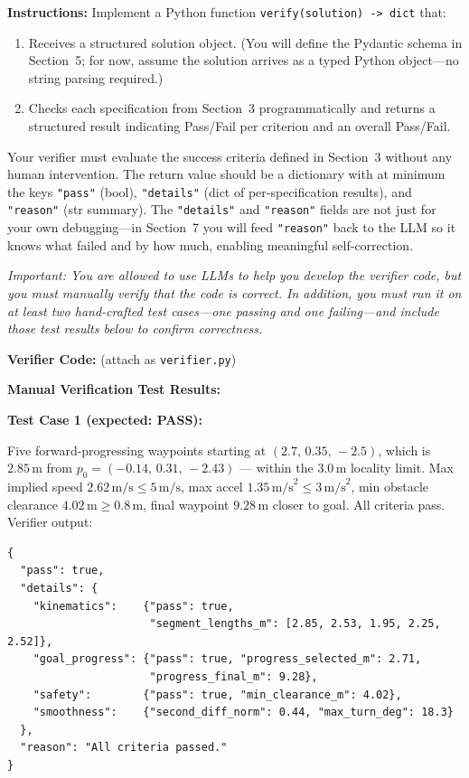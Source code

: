 \documentclass[12pt]{article}
\begin{document}
\noindent\textbf{Instructions:} Implement a Python function
\texttt{verify(solution) -> dict} that:
\begin{enumerate}
  \item Receives a structured solution object. (You will define the Pydantic schema in
    Section~5; for now, assume the solution arrives as a typed Python object---no string
    parsing required.)
  \item Checks each specification from Section~3 programmatically and returns a structured
    result indicating Pass/Fail per criterion and an overall Pass/Fail.
\end{enumerate}
Your verifier must evaluate the success criteria defined in Section~3 without any human
intervention. The return value should be a dictionary with at minimum the keys \texttt{"pass"}
(bool), \texttt{"details"} (dict of per-specification results), and \texttt{"reason"} (str
summary). The \texttt{"details"} and \texttt{"reason"} fields are not just for your own
debugging---in Section~7 you will feed \texttt{"reason"} back to the LLM so it knows what
failed and by how much, enabling meaningful self-correction.

\medskip
\noindent\textit{Important: You are allowed to use LLMs to help you develop the verifier code,
but you must manually verify that the code is correct. In addition, you must run it on at least
two hand-crafted test cases---one passing and one failing---and include those test results below
to confirm correctness.}

\bigskip
\noindent\textbf{Verifier Code:} (attach as \texttt{verifier.py})



\bigskip
\noindent\textbf{Manual Verification Test Results:}

\medskip
\noindent\textbullet\quad\textbf{Test Case 1 (expected: PASS):}

\medskip
Five forward-progressing waypoints starting at $(2.7,\,0.35,\,-2.5)$, which is $2.85\,\text{m}$
from $p_0 = (-0.14,\,0.31,\,-2.43)$ --- within the $3.0\,\text{m}$ locality limit.
Max implied speed $2.62\,\text{m/s} \leq 5\,\text{m/s}$, max accel
$1.35\,\text{m/s}^2 \leq 3\,\text{m/s}^2$, min obstacle clearance $4.02\,\text{m} \geq 0.8\,\text{m}$,
final waypoint $9.28\,\text{m}$ closer to goal. All criteria pass. Verifier output:

\begin{lstlisting}[style=jsoncode]
{
  "pass": true,
  "details": {
    "kinematics":    {"pass": true,
                      "segment_lengths_m": [2.85, 2.53, 1.95, 2.25, 2.52]},
    "goal_progress": {"pass": true, "progress_selected_m": 2.71,
                      "progress_final_m": 9.28},
    "safety":        {"pass": true, "min_clearance_m": 4.02},
    "smoothness":    {"second_diff_norm": 0.44, "max_turn_deg": 18.3}
  },
  "reason": "All criteria passed."
}
\end{lstlisting}
\end{document}

